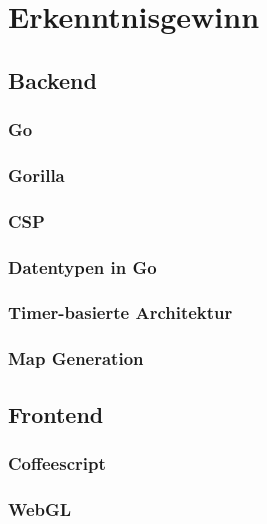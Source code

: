 \section{Erkenntnisgewinn}
\subsection{Backend}
\subsubsection{Go}
\subsubsection{Gorilla}
\subsubsection{CSP}
\subsubsection{Datentypen in Go}
\subsubsection{Timer-basierte Architektur}
\subsubsection{Map Generation}

\subsection{Frontend}
\subsubsection{Coffeescript}
\subsubsection{WebGL}
